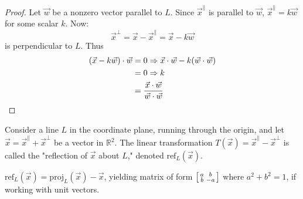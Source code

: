 \documentclass[a4paper,11pt]{article}
\begin{document}
\begin{outline}
    \begin{proof}
      Let \(\vec{w}\) be a nonzero vector parallel to \(L\). Since \(\vec{x}^{\parallel}\) 
      is parallel to \(\vec{w}\),
      \(\vec{x}^{\parallel} = k\vec{w}\) for some scalar \(k\). Now:
      \[
        \vec{x}^{\perp} = \vec{x} - \vec{x}^{\parallel} = \vec{x} - k\vec{w}
      \]
      is perpendicular to \(L\). Thus
      \begin{align*}
        (\vec{x} - k\vec{w}) \cdot \vec{w} &= 0 \Rightarrow \vec{x}\cdot\vec{w} - k(\vec{w}\cdot\vec{w})\\
                                           &= 0 \Rightarrow k\\
                                           &= \frac{\vec{x}\cdot\vec{w}}{\vec{w}\cdot\vec{w}}
      \end{align*}
    \end{proof}

    Consider a line \(L\) in the coordinate plane, running through the origin, and let 
    \(\vec{x} = \vec{x}^{\parallel} + \vec{x}^{\perp}\) be a vector in \(\mathbb{R}^2\). The linear transformation
    \(T(\vec{x}) = \vec{x}^{\parallel} - \vec{x}^{\perp}\) is called the "reflection of \(\vec{x}\) about \(L\)," 
    denoted \(\text{ref}_{L}(\vec{x})\).
    
    \(\text{ref}_{L}(\vec{x}) = \text{proj}_{L}(\vec{x}) - \vec{x}\), yielding matrix of form 
    \(\begin{bsmallmatrix} a&b\\ b&-a \end{bsmallmatrix}\) where \(a^2 + b^2 = 1\), if working with unit vectors.
    

\end{outline}
\end{document}
